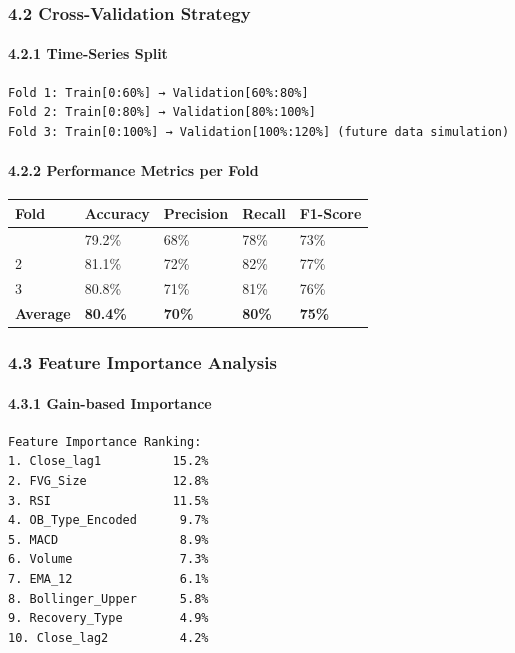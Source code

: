\subsubsection{4.2 Cross-Validation
Strategy}\label{cross-validation-strategy}

\paragraph{4.2.1 Time-Series Split}\label{time-series-split}

\begin{verbatim}
Fold 1: Train[0:60%] → Validation[60%:80%]
Fold 2: Train[0:80%] → Validation[80%:100%]
Fold 3: Train[0:100%] → Validation[100%:120%] (future data simulation)
\end{verbatim}

\paragraph{4.2.2 Performance Metrics per
Fold}\label{performance-metrics-per-fold}

\begin{longtable}[]{@{}lllll@{}}
\toprule\noalign{}
Fold & Accuracy & Precision & Recall & F1-Score \\
\midrule\noalign{}
\endhead
\bottomrule\noalign{}
\endlastfoot
1 & 79.2\% & 68\% & 78\% & 73\% \\
2 & 81.1\% & 72\% & 82\% & 77\% \\
3 & 80.8\% & 71\% & 81\% & 76\% \\
\textbf{Average} & \textbf{80.4\%} & \textbf{70\%} & \textbf{80\%} &
\textbf{75\%} \\
\end{longtable}

\subsubsection{4.3 Feature Importance
Analysis}\label{feature-importance-analysis}

\paragraph{4.3.1 Gain-based Importance}\label{gain-based-importance}

\begin{verbatim}
Feature Importance Ranking:
1. Close_lag1          15.2%
2. FVG_Size            12.8%
3. RSI                 11.5%
4. OB_Type_Encoded      9.7%
5. MACD                 8.9%
6. Volume               7.3%
7. EMA_12               6.1%
8. Bollinger_Upper      5.8%
9. Recovery_Type        4.9%
10. Close_lag2          4.2%
\end{verbatim}

